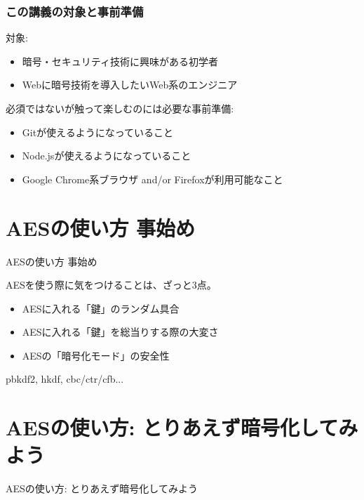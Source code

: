 \documentclass[12pt,dvipdfmx]{beamer}
\begin{document}
\begin{frame}
\frametitle{この講義の対象と事前準備}
対象:
\begin{itemize}
\item 暗号・セキュリティ技術に興味がある初学者
\item Webに暗号技術を導入したいWeb系のエンジニア
\end{itemize}

\vspace{2ex}

必須ではないが触って楽しむのには必要な事前準備:
\begin{itemize}
\item Gitが使えるようになっていること
\item Node.jsが使えるようになっていること
\item Google Chrome系ブラウザ and/or Firefoxが利用可能なこと
\end{itemize}
\end{frame}


\section{AESの使い方 事始め}
\begin{frame}
\centering
{\Large AESの使い方 事始め}
\end{frame}

\begin{frame}
AESを使う際に気をつけることは、ざっと3点。
\begin{itemize}
 \item AESに入れる「鍵」のランダム具合
 \item AESに入れる「鍵」を総当りする際の大変さ
 \item AESの「暗号化モード」の安全性
\end{itemize}

pbkdf2, hkdf, cbc/ctr/cfb...
\end{frame}

\section{AESの使い方: とりあえず暗号化してみよう}
\begin{frame}
\centering
{\Large AESの使い方: とりあえず暗号化してみよう}
\end{frame}
\end{document}
